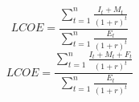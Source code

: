 \documentclass{article}
\begin{document}
{\Large
\[
LCOE = \frac{\sum_{t=1}^{n}\frac{I_t+M_t}{(1+r)^t}}{\sum_{t=1}^{n}\frac{E_t}{(1+r)^t}}
\]
}
\vspace{100pt}
{\Large
\[
LCOE = \frac{\sum_{t=1}^{n}\frac{I_t+M_t+F_t}{(1+r)^t}}{\sum_{t=1}^{n}\frac{E_t}{(1+r)^t}}
\]
}
\end{document}
